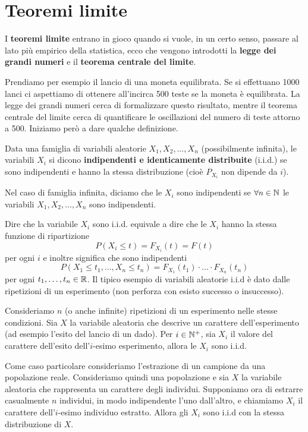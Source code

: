 \section{Teoremi limite}
I \textbf{teoremi limite} entrano in gioco quando si vuole, in un certo senso, passare al lato
più empirico della statistica, ecco che vengono introdotti la \textbf{legge dei grandi numeri} e
il \textbf{teorema centrale del limite}.

Prendiamo per esempio il lancio di una moneta equilibrata. Se si effettuano 1000 lanci ci
aspettiamo di ottenere all'incirca 500 teste se la moneta è equilibrata. La legge dei grandi numeri
cerca di formalizzare questo risultato, mentre il teorema centrale del limite cerca di quantificare
le oscillazioni del numero di teste attorno a 500. Iniziamo però a dare qualche definizione.

\begin{definition}
	Data una famiglia di variabili aleatorie $X_1, X_2, \dots, X_n$ (possibilmente infinita), le
	variabili $X_i$ si dicono \textbf{indipendenti e identicamente distribuite} (i.i.d.) se sono
	indipendenti e hanno la stessa distribuzione (cioè $P_{X_i}$ non dipende da $i$).
\end{definition}

Nel caso di famiglia infinita, diciamo che le $X_i$ sono indipendenti se $\forall n \in \mathbb{N}$ le
variabili $X_1, X_2, \dots, X_n$ sono indipendenti.

Dire che la variabile $X_i$ sono i.i.d. equivale a dire che le $X_i$ hanno la stessa funzione di
ripartizione
\[ P(X_i \leq t) = F_{X_i} (t) = F(t) \]
per ogni $i$ e inoltre significa che sono indipendenti
\[ P(X_1 \leq t_1, \dots, X_n \leq t_n) = F_{X_1} (t_1) \cdot ... \cdot F_{X_n} (t_n) \]
per ogni $t_1, \dots, t_n \in \mathbb{R}$. Il tipico esempio di variabili aleatorie i.i.d è dato dalle
ripetizioni di un esperimento (non perforza con esisto successo o insuccesso).

Consideriamo $n$ (o anche infinite) ripetizioni di un esperimento nelle stesse condizioni. Sia
$X$ la variabile aleatoria che descrive un carattere dell'esperimento (ad esempio l'esito del
lancio di un dado). Per $i \in \mathbb{N}^+$, sia $X_i$ il valore del carattere dell'esito dell'$i$-esimo
esperimento, allora le $X_i$ sono i.i.d.

Come caso particolare consideriamo l'estrazione di un campione da una popolazione reale.
Consideriamo quindi una popolazione e sia $X$ la variabile aleatoria che rappresenta un carattere
degli individui. Supponiamo ora di estrarre casualmente $n$ individui, in modo indipendente l'uno
dall'altro, e chiamiamo $X_i$ il carattere dell'$i$-esimo individuo estratto. Allora gli $X_i$
sono i.i.d con la stessa distribuzione di $X$.

